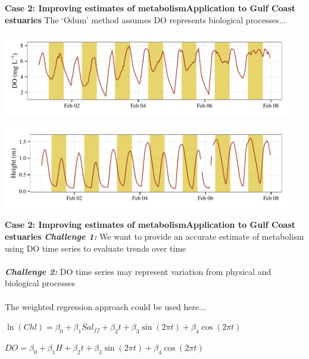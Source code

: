 \documentclass[serif]{beamer}\usepackage[]{graphicx}\usepackage[]{color}
\newcommand{\emtxt}[1]{\textbf{\textit{#1}}}
\begin{document}
\begin{frame}{\textbf{Case 2: Improving estimates of metabolism}}{\textbf{Application to Gulf Coast estuaries}}
The `Odum' method assumes DO represents biological processes...


{\centering \includegraphics[width=0.95\textwidth]{fig/sapdo} 

}





{\centering \includegraphics[width=0.95\textwidth]{fig/saptide} 

}



\end{frame}

\begin{frame}{\textbf{Case 2: Improving estimates of metabolism}}{\textbf{Application to Gulf Coast estuaries}}
\emtxt{Challenge 1:} We want to provide an accurate estimate of metabolism using DO time series to evaluate trends over time \\~\\
\emtxt{Challenge 2:} DO time series may represent variation from physical and biological processes \\~\\
The weighted regression approach could be used here...
\vspace{0.15in}
\begin{center}
$\ln\left(Chl\right) = \beta_0 + \beta_1 Sal_{ff} + \beta_2 t + \beta_3 \sin\left(2\pi t\right) + \beta_4 \cos\left(2\pi t\right)$
\end{center}
\vspace{0.05in}
\begin{center}
$DO = \beta_0 + \beta_1 H + \beta_2 t + \beta_3 \sin\left(2\pi t\right) + \beta_4 \cos\left(2\pi t\right)$
\end{center}
\end{frame}
\end{document}
